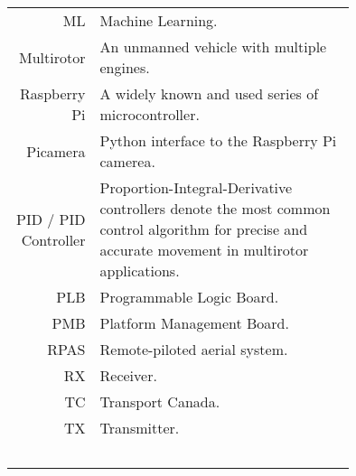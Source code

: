 \begin{tabular}[h]{rp{0.75\linewidth}}
    ML & Machine Learning.\\
    Multirotor & An unmanned vehicle with multiple engines. \\
    Raspberry Pi & A widely known and used series of microcontroller. \\
    Picamera & Python interface to the Raspberry Pi camerea. \\
    PID / PID Controller & Proportion-Integral-Derivative controllers denote the most common control algorithm for precise and accurate movement in multirotor applications.\\
    PLB & Programmable Logic Board. \\
    PMB & Platform Management Board. \\
    RPAS & Remote-piloted aerial system.\\
    RX & Receiver.\\
    TC & Transport Canada.\\
    TX & Transmitter.\\\
     & \\

    \hline

\end{tabular}
